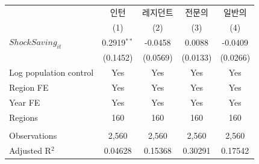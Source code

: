 \begingroup
\centering
\begin{tabular}{lcccc}
   \toprule
                          & 인턴          & 레지던트 & 전문의   & 일반의 \\   
                          & (1)           & (2)      & (3)      & (4)\\  
   \midrule 
   $ShockSaving_{it}$     & 0.2919$^{**}$ & -0.0458  & 0.0088   & -0.0409\\   
                          & (0.1452)      & (0.0569) & (0.0133) & (0.0266)\\   
   Log population control & Yes           & Yes      & Yes      & Yes\\  
   Region FE              & Yes           & Yes      & Yes      & Yes\\  
   Year FE                & Yes           & Yes      & Yes      & Yes\\  
   Regions                & 160           & 160      & 160      & 160\\  
    \\
   Observations           & 2,560         & 2,560    & 2,560    & 2,560\\  
   Adjusted R$^2$         & 0.04628       & 0.15368  & 0.30291  & 0.17542\\  
   \bottomrule
\end{tabular}
\par\endgroup
